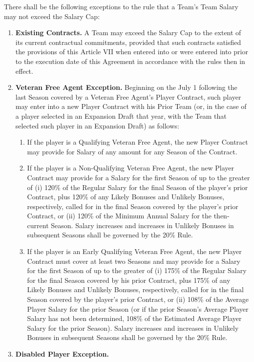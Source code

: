 \documentclass[
]{book}
\providecommand{\tightlist}{%
  \setlength{\itemsep}{0pt}\setlength{\parskip}{0pt}}
\begin{document}
There shall be the following exceptions to the rule that a Team's Team Salary may not exceed the Salary Cap:

\begin{enumerate}
\def\labelenumi{(\alph{enumi})}
\tightlist
\item
  \textbf{Existing Contracts.} A Team may exceed the Salary Cap to the extent of its current contractual commitments, provided that such contracts satisfied the provisions of this Article VII when entered into or were entered into prior to the execution date of this Agreement in accordance with the rules then in effect.
\item
  \textbf{Veteran Free Agent Exception.} Beginning on the July 1 following the last Season covered by a Veteran Free Agent's Player Contract, such player may enter into a new Player Contract with his Prior Team (or, in the case of a player selected in an Expansion Draft that year, with the Team that selected such player in an Expansion Draft) as follows:

  \begin{enumerate}
  \def\labelenumii{(\arabic{enumii})}
  \tightlist
  \item
    If the player is a Qualifying Veteran Free Agent, the new Player Contract may provide for Salary of any amount for any Season of the Contract.
  \item
    If the player is a Non-Qualifying Veteran Free Agent, the new Player Contract may provide for a Salary for the first Season of up to the greater of (i) 120\% of the Regular Salary for the final Season of the player's prior Contract, plus 120\% of any Likely Bonuses and Unlikely Bonuses, respectively, called for in the final Season covered by the player's prior Contract, or (ii) 120\% of the Minimum Annual Salary for the then-current Season. Salary increases and increases in Unlikely Bonuses in subsequent Seasons shall be governed by the 20\% Rule.
  \item
    If the player is an Early Qualifying Veteran Free Agent, the new Player Contract must cover at least two Seasons and may provide for a Salary for the first Season of up to the greater of (i) 175\% of the Regular Salary for the final Season covered by his prior Contract, plus 175\% of any Likely Bonuses and Unlikely Bonuses, respectively, called for in the final Season covered by the player's prior Contract, or (ii) 108\% of the Average Player Salary for the prior Season (or if the prior Season's Average Player Salary has not been determined, 108\% of the Estimated Average Player Salary for the prior Season). Salary increases and increases in Unlikely Bonuses in subsequent Seasons shall be governed by the 20\% Rule.
  \end{enumerate}
\item
  \textbf{Disabled Player Exception.}


\end{enumerate}
\end{document}
